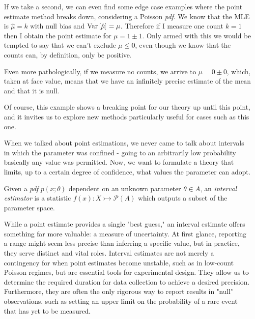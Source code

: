 \begin{example}
	If we take a second, we can even find some edge case examples where the point estimate method breaks down, considering a Poisson \emph{pdf}. We know that the MLE is $\hat\mu=k$ with null bias and $\operatorname{Var}\left[\hat\mu\right] = \mu$. Therefore if I measure one count $k=1$ then I obtain the point estimate for $\mu = 1\pm1$. Only armed with this we would be tempted to say that we can't exclude $\mu\leq0$, even though we know that the counts can, by definition, only be positive.
	
	Even more pathologically, if we measure no counts, we arrive to $\mu=0\pm0$, which, taken at face value, means that we have an infinitely precise estimate of the mean and that it is null. 
	
	Of course, this example shows a breaking point for our theory up until this point, and it invites us to explore new methods particularly useful for cases such as this one.
\end{example}

When we talked about point estimations, we never came to talk about intervals in which the parameter was confined - going to an arbitrarily low probability basically any value was permitted. Now, we want to formulate a theory that limits, up to a certain degree of confidence, what values the parameter can adopt. 

\begin{definition}
	Given a \emph{pdf} $p(x;\theta)$ dependent on an unknown parameter $\theta\in A$, an \emph{interval estimator} is a statistic $f(x): X\rightarrowtail \mathcal{P}(A)$ which outputs a subset of the parameter space.
\end{definition}

While a point estimate provides a single "best guess," an interval estimate offers something far more valuable: a measure of uncertainty. At first glance, reporting a range might seem less precise than inferring a specific value, but in practice, they serve distinct and vital roles. Interval estimates are not merely a contingency for when point estimates become unstable, such as in low-count Poisson regimes, but are essential tools for experimental design. They allow us to determine the required duration for data collection to achieve a desired precision. Furthermore, they are often the only rigorous way to report results in "null" observations, such as setting an upper limit on the probability of a rare event that has yet to be measured.


